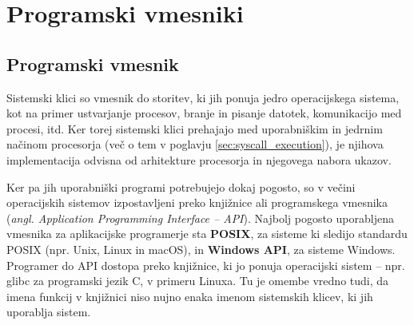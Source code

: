\documentclass[a4paper,12pt,openright]{book}
\begin{document}
\chapter{Programski vmesniki}


\section{Programski vmesnik} \label{sec:syscalls}

Sistemski klici so vmesnik do storitev, ki jih ponuja jedro operacijskega sistema, kot na primer ustvarjanje procesov, branje in pisanje datotek, komunikacijo med procesi, itd.
Ker torej sistemski klici prehajajo med uporabniškim in jedrnim načinom procesorja (več o tem v poglavju \ref{sec:syscall_execution}), je njihova implementacija odvisna od arhitekture procesorja in njegovega nabora ukazov.

Ker pa jih uporabniški programi potrebujejo dokaj pogosto, so v večini operacijskih sistemov izpostavljeni preko knjižnice ali programskega vmesnika (\textit{angl. Application Programming Interface -- API}).
Najbolj pogosto uporabljena vmesnika za aplikacijske programerje sta \textbf{POSIX}, za sisteme ki sledijo standardu POSIX (npr. Unix, Linux in macOS), in \textbf{Windows API}, za sisteme Windows.
Programer do API dostopa preko knjižnice, ki jo ponuja operacijski sistem -- npr. glibc za programski jezik C, v primeru Linuxa.
Tu je omembe vredno tudi, da imena funkcij v knjižnici niso nujno enaka imenom sistemskih klicev, ki jih uporablja sistem.
\end{document}
